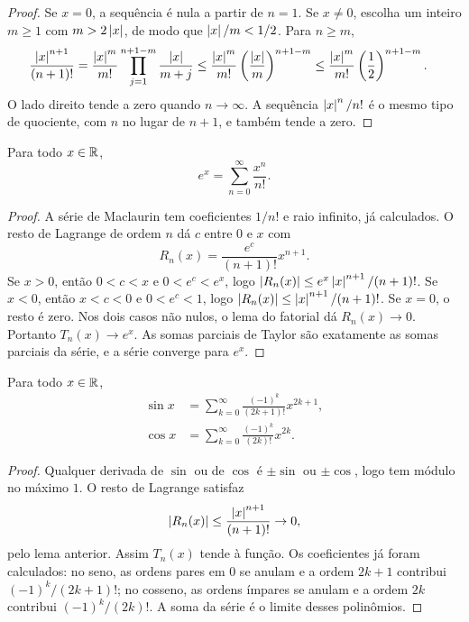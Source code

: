 \documentclass[11pt,a4paper]{article}
\begin{document}
\begin{proof}
Se \(x=0\), a sequência é nula a partir de \(n=1\). Se \(x\neq 0\), escolha um inteiro \(m\ge 1\) com \(m>2\left\lvert x \right\rvert\), de modo que \(\left\lvert x \right\rvert/m<1/2\). Para \(n\ge m\),
\begin{align*}
\frac{\left\lvert x \right\rvert^{n+1}}{(n+1)!}
&=\frac{\left\lvert x \right\rvert^{m}}{m!}\prod_{j=1}^{n+1-m}\frac{\left\lvert x \right\rvert}{m+j}
\le\frac{\left\lvert x \right\rvert^{m}}{m!}\left(\frac{\left\lvert x \right\rvert}{m}\right)^{n+1-m}
\le\frac{\left\lvert x \right\rvert^{m}}{m!}\left(\frac{1}{2}\right)^{n+1-m}.
\end{align*}
O lado direito tende a zero quando \(n\to\infty\). A sequência \(\left\lvert x \right\rvert^n/n!\) é o mesmo tipo de quociente, com \(n\) no lugar de \(n+1\), e também tende a zero.
\end{proof}

\begin{teorema}
Para todo \(x\in\mathbb{R}\),
\[
e^x=\sum_{n=0}^\infty\frac{x^n}{n!}.
\]
\end{teorema}

\begin{proof}
A série de Maclaurin tem coeficientes \(1/n!\) e raio infinito, já calculados. O resto de Lagrange de ordem \(n\) dá \(c\) entre \(0\) e \(x\) com
\[
R_n(x)=\frac{e^{c}}{(n+1)!}x^{n+1}.
\]
Se \(x>0\), então \(0<c<x\) e \(0<e^{c}<e^{x}\), logo \(\left\lvert R_n(x) \right\rvert\le e^{x}\left\lvert x \right\rvert^{n+1}/(n+1)!\). Se \(x<0\), então \(x<c<0\) e \(0<e^{c}<1\), logo \(\left\lvert R_n(x) \right\rvert\le\left\lvert x \right\rvert^{n+1}/(n+1)!\). Se \(x=0\), o resto é zero. Nos dois casos não nulos, o lema do fatorial dá \(R_n(x)\to 0\). Portanto \(T_n(x)\to e^x\). As somas parciais de Taylor são exatamente as somas parciais da série, e a série converge para \(e^x\).
\end{proof}

\begin{teorema}
Para todo \(x\in\mathbb{R}\),
\begin{align*}
\sin x&=\sum_{k=0}^\infty\frac{(-1)^k}{(2k+1)!}x^{2k+1},\\
\cos x&=\sum_{k=0}^\infty\frac{(-1)^k}{(2k)!}x^{2k}.
\end{align*}
\end{teorema}

\begin{proof}
Qualquer derivada de \(\sin\) ou de \(\cos\) é \(\pm\sin\) ou \(\pm\cos\), logo tem módulo no máximo \(1\). O resto de Lagrange satisfaz
\[
\left\lvert R_n(x) \right\rvert\le\frac{\left\lvert x \right\rvert^{n+1}}{(n+1)!}\to 0,
\]
pelo lema anterior. Assim \(T_n(x)\) tende à função. Os coeficientes já foram calculados: no seno, as ordens pares em \(0\) se anulam e a ordem \(2k+1\) contribui \((-1)^k/(2k+1)!\); no cosseno, as ordens ímpares se anulam e a ordem \(2k\) contribui \((-1)^k/(2k)!\). A soma da série é o limite desses polinômios.
\end{proof}
\end{document}
